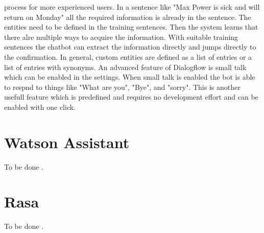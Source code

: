 process for more experienced users.
In a sentence like "Max Power is sick and will return on Monday" all the required information is 
already in the sentence. 
The entities need to be defined in the training sentences.
Then the system learns that there alre multiple ways to acquire the information.
With suitable training sentences the chatbot can extract the information 
directly and jumps directly to the confirmation.  
In general, custom entities are defined as a list of entries or a list of entries with 
synonyms.
An advanced feature of Dialogflow is small talk which can be enabled in the settings.
When small talk is enabled the bot is able to respnd to things like "What are you",
"Bye", and "sorry".
This is another usefull feature which is predefined and requires no development effort
and can be enabled with one click. 

\section{Watson Assistant}
To be done \cite{watsonassistant}.
 
\section{Rasa}
To be done \cite{rasa}.

